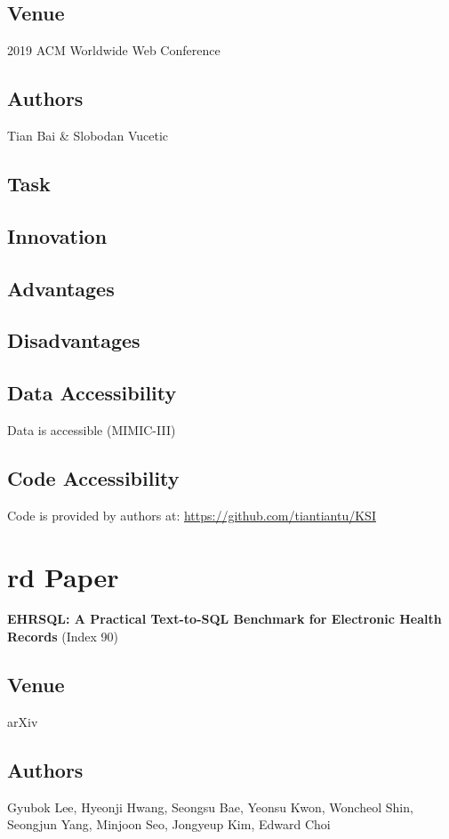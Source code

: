 \documentclass[
	letterpaper, %
]{jdf}
\begin{document}
\subsection{Venue}
2019 ACM Worldwide Web Conference
\subsection{Authors}
Tian Bai & Slobodan Vucetic
\subsection{Task}

\subsection{Innovation}

\subsection{Advantages}

\subsection{Disadvantages}

\subsection{Data Accessibility}
Data is accessible (MIMIC-III)

\subsection{Code Accessibility}
Code is provided by authors at:
\href{https://github.com/tiantiantu/KSI}{https://github.com/tiantiantu/KSI}

\section{rd Paper}
\textbf{EHRSQL: A Practical Text-to-SQL Benchmark for Electronic Health Records} (Index 90)
\subsection{Venue}
arXiv
\subsection{Authors}
Gyubok Lee, Hyeonji Hwang, Seongsu Bae, Yeonsu Kwon, Woncheol Shin, Seongjun Yang, Minjoon Seo, Jongyeup Kim, Edward Choi
\end{document}
